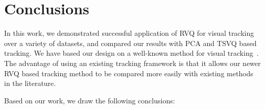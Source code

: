 \chapter{Conclusions}
\label{chap_conclusions}	

In this work, we demonstrated successful application of RVQ for visual tracking over a variety of datasets, and compared our results with PCA and TSVQ based tracking.  We have based our design on a well-known method for visual tracking~\cite{2008_JNL_subspaceTRK_Ross}.  The advantage of using an existing tracking framework is that it allows our newer RVQ based tracking method to be compared more easily with existing methods in the literature.

Based on our work, we draw the following conclusions:

